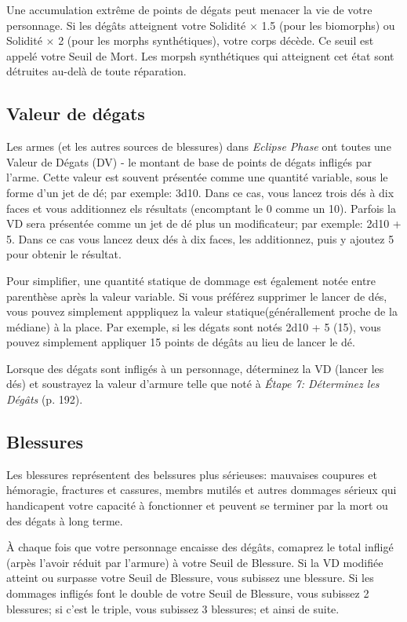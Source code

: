 Une accumulation extrême de points de dégats peut menacer la vie de votre personnage. Si les dégâts atteignent votre Solidité $\times$ 1.5 (pour les biomorphs) ou Solidité $\times$ 2 (pour les morphs synthétiques), votre corps décède. Ce seuil est appelé votre Seuil de Mort. Les morpsh synthétiques qui atteignent cet état sont détruites au-delà de toute réparation. 

\subsection{Valeur de dégats} 

Les armes (et les autres sources de blessures) dans \emph{Eclipse Phase} ont toutes une Valeur de Dégats (DV) - le montant de base de points de dégats infligés par l'arme. Cette valeur est souvent présentée comme une quantité variable, sous le forme d'un jet de dé; par exemple: 3d10. Dans ce cas, vous lancez trois dés à dix faces et vous additionnez els résultats (encomptant le 0 comme un 10). Parfois la VD sera présentée comme un jet de dé plus un modificateur; par exemple: 2d10 + 5. Dans ce cas vous lancez deux dés à dix faces, les additionnez, puis y ajoutez 5 pour obtenir le résultat. 

Pour simplifier, une quantité statique de dommage est également notée entre parenthèse après la valeur variable. Si vous préférez supprimer le lancer de dés, vous pouvez simplement apppliquez la valeur statique(générallement proche de la médiane) à la place. Par exemple, si les dégats sont notés 2d10 + 5 (15), vous pouvez simplement appliquer 15 points de dégâts au lieu de lancer le dé. 

Lorsque des dégats sont infligés à un personnage, déterminez la VD (lancer les dés) et soustrayez la valeur d'armure telle que noté à \emph{Étape 7: Déterminez les Dégâts} (p. 192). 

\subsection{Blessures} \label{sec:wounds} 

Les blessures représentent des belssures plus sérieuses: mauvaises coupures et hémoragie, fractures et cassures, membrs mutilés et autres dommages sérieux qui handicapent votre capacité à fonctionner et peuvent se terminer par la mort ou des dégats à long terme. 

À chaque fois que votre personnage encaisse des dégâts, comaprez le total infligé (arpès l'avoir réduit par l'armure) à votre Seuil de Blessure. Si la VD modifiée atteint ou surpasse votre Seuil de Blessure, vous subissez une blessure. Si les dommages infligés font le double de votre Seuil de Blessure, vous subissez 2 blessures; si c'est le triple, vous subissez 3 blessures; et ainsi de suite. 


